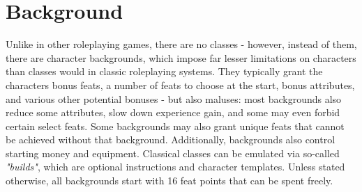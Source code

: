 \section{Background}
Unlike in other roleplaying games, there are no classes - however, instead of them, there are character backgrounds, which impose far lesser limitations on characters than classes would in classic roleplaying systems. They typically grant the characters bonus feats, a number of feats to choose at the start, bonus attributes, and various other potential bonuses - but also maluses: most backgrounds also reduce some attributes, slow down experience gain, and some may even forbid certain select feats. Some backgrounds may also grant unique feats that cannot be achieved without that background. Additionally, backgrounds also control starting money and equipment.\newline
Classical classes can be emulated via so-called \textit{"builds"}, which are optional instructions and character templates.\newline
Unless stated otherwise, all backgrounds start with 16 feat points that can be spent freely.
